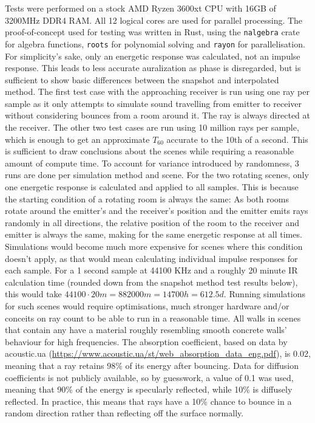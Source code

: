 Tests were performed on a stock AMD Ryzen 3600xt CPU with 16GB of 3200MHz DDR4 RAM.
All 12 logical cores are used for parallel processing.
\newline
The proof-of-concept used for testing was written in Rust, using the \verb|nalgebra| crate for algebra functions,
\verb|roots| for polynomial solving and \verb|rayon| for parallelisation.
For simplicity's sake, only an energetic response was calculated, not an impulse response.
This leads to less accurate auralization as phase is disregarded,
but is sufficient to show basic differences between the snapshot and interpolated method.
\newline
The first test case with the approaching receiver is run using one ray per sample
as it only attempts to simulate sound travelling from emitter to receiver
without considering bounces from a room around it.
The ray is always directed at the receiver.
\newline
The other two test cases are run using 10 million rays per sample,
which is enough to get an approximate \(T_{60}\) accurate to the 10th of a second.
This is sufficient to draw conclusions about the scenes while requiring a reasonable amount of compute time.
To account for variance introduced by randomness, 3 runs are done per simulation method and scene.
\newline
For the two rotating scenes, only one energetic response is calculated and applied to all samples.
This is because the starting condition of a rotating room is always the same:
As both rooms rotate around the emitter's and the receiver's position
and the emitter emits rays randomly in all directions,
the relative position of the room to the receiver and emitter is always the same,
making for the same energetic response at all times.
\newline
Simulations would become much more expensive for scenes where this condition doesn't apply,
as that would mean calculating individual impulse responses for each sample.
For a 1 second sample at 44100 KHz and a roughly 20 minute IR calculation time
(rounded down from the snapshot method test results below),
this would take \(44100 \cdot 20 m = 882000 m = 14700 h = 612.5 d\).
Running simulations for such scenes would require optimisations, much stronger hardware
and/or conceits on ray count to be able to run in a reasonable time.
\newline
All walls in scenes that contain any have a material roughly resembling smooth concrete walls' behaviour for high frequencies.
The absorption coefficient, based on data by acoustic.ua (\url{https://www.acoustic.ua/st/web_absorption_data_eng.pdf}),
is 0.02, meaning that a ray retains 98\% of its energy after bouncing.
Data for diffusion coefficients is not publicly available, so by guesswork, a value of 0.1 was used,
meaning that 90\% of the energy is specularly reflected, while 10\% is diffusely reflected.
In practice, this means that rays have a 10\% chance to bounce in a random direction rather than reflecting off the surface normally.

